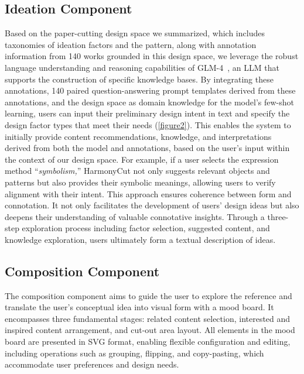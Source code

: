 \subsection{Ideation Component}
Based on the paper-cutting design space we summarized, which includes taxonomies of ideation factors and the pattern, along with annotation information from 140 works grounded in this design space, we leverage the robust language understanding and reasoning capabilities of GLM-4~\cite{Teamglm:2024:chatglm}, an LLM that supports the construction of specific knowledge bases. By integrating these annotations, 140 paired question-answering prompt templates derived from these annotations, and the design space as domain knowledge for the model's few-shot learning, users can input their preliminary design intent in text and specify the design factor types that meet their needs (\autoref{figure2}). This enables the system to initially provide content recommendations, knowledge, and interpretations derived from both the model and annotations, based on the user's input within the context of our design space. For example, if a user selects the expression method ``\textit{symbolism,}'' HarmonyCut not only suggests relevant objects and patterns but also provides their symbolic meanings, allowing users to verify alignment with their intent. This approach ensures coherence between form and connotation. It not only facilitates the development of users' design ideas but also deepens their understanding of valuable connotative insights. Through a three-step exploration process including factor selection, suggested content, and knowledge exploration, users ultimately form a textual description of ideas.

\subsection{Composition Component}
The composition component aims to guide the user to explore the reference and translate the user's conceptual idea into visual form with a mood board. It encompasses three fundamental stages: related content selection, interested and inspired content arrangement, and cut-out area layout.  All elements in the mood board are presented in SVG format, enabling flexible configuration and editing, including operations such as grouping, flipping, and copy-pasting, which accommodate user preferences and design needs.
